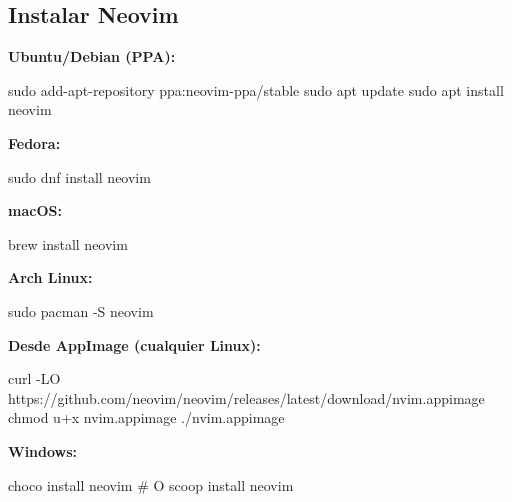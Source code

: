 \documentclass[
  doc,
  floatsintext,
  longtable,
  a4paper,
  nolmodern,
  notxfonts,
  notimes,
  12pt,
  colorlinks=true,linkcolor=blue,citecolor=blue,urlcolor=blue]{apa7}
\newenvironment{Shaded}{\begin{snugshade}}{\end{snugshade}}
\newcommand{\AttributeTok}[1]{\textcolor[rgb]{0.40,0.45,0.13}{#1}}
\newcommand{\CommentTok}[1]{\textcolor[rgb]{0.37,0.37,0.37}{#1}}
\newcommand{\ExtensionTok}[1]{\textcolor[rgb]{0.00,0.23,0.31}{#1}}
\newcommand{\FunctionTok}[1]{\textcolor[rgb]{0.28,0.35,0.67}{#1}}
\newcommand{\NormalTok}[1]{\textcolor[rgb]{0.00,0.23,0.31}{#1}}
\begin{document}
\subsection{Instalar Neovim}\label{instalar-neovim}

\textbf{Ubuntu/Debian (PPA):}

\begin{Shaded}
\begin{Highlighting}[]
\FunctionTok{sudo}\NormalTok{ add{-}apt{-}repository ppa:neovim{-}ppa/stable}
\FunctionTok{sudo}\NormalTok{ apt update}
\FunctionTok{sudo}\NormalTok{ apt install neovim}
\end{Highlighting}
\end{Shaded}

\textbf{Fedora:}

\begin{Shaded}
\begin{Highlighting}[]
\FunctionTok{sudo}\NormalTok{ dnf install neovim}
\end{Highlighting}
\end{Shaded}

\textbf{macOS:}

\begin{Shaded}
\begin{Highlighting}[]
\ExtensionTok{brew}\NormalTok{ install neovim}
\end{Highlighting}
\end{Shaded}

\textbf{Arch Linux:}

\begin{Shaded}
\begin{Highlighting}[]
\FunctionTok{sudo}\NormalTok{ pacman }\AttributeTok{{-}S}\NormalTok{ neovim}
\end{Highlighting}
\end{Shaded}

\textbf{Desde AppImage (cualquier Linux):}

\begin{Shaded}
\begin{Highlighting}[]
\ExtensionTok{curl} \AttributeTok{{-}LO}\NormalTok{ https://github.com/neovim/neovim/releases/latest/download/nvim.appimage}
\FunctionTok{chmod}\NormalTok{ u+x nvim.appimage}
\ExtensionTok{./nvim.appimage}
\end{Highlighting}
\end{Shaded}

\textbf{Windows:}

\begin{Shaded}
\begin{Highlighting}[]
\ExtensionTok{choco}\NormalTok{ install neovim}
\CommentTok{\# O}
\ExtensionTok{scoop}\NormalTok{ install neovim}
\end{Highlighting}
\end{Shaded}
\end{document}
